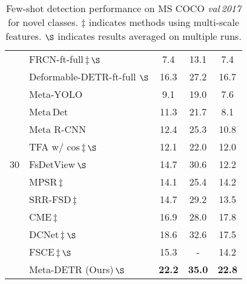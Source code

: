 \documentclass[letterpaper]{article} \usepackage{aaai22}  \usepackage{times}  \usepackage{helvet}  \usepackage{courier}  \usepackage[hyphens]{url}  \usepackage{graphicx} \urlstyle{rm} \def\UrlFont{\rm}  \usepackage{natbib}  \usepackage{caption} \DeclareCaptionStyle{ruled}{labelfont=normalfont,labelsep=colon,strut=off} \frenchspacing  \setlength{\pdfpagewidth}{8.5in}  \setlength{\pdfpageheight}{11in}  \usepackage{algorithm}
\begin{document}
\begin{table}[t!]
\begin{center}
{\begin{tabular}[t]{ c | l | ccc }
\midrule[0.66pt]

\multirow{13}{*}{30} & FRCN-ft-full\;\cite{FasterRCNN}\,$\ddag$\,$\S$ & 7.4 & 13.1 & 7.4 \\

& Deformable-DETR-ft-full\,\cite{DeformableDETR}\,$\S$ & 16.3 & 27.2 & 16.7 \\

& Meta-YOLO\;\cite{FewshotReweighting} & 9.1 & 19.0 & 7.6\\

& Meta\,Det\;\cite{metadet} & 11.3 & 21.7 & 8.1\\

& Meta R-CNN\;\cite{metarcnn} & 12.4 & 25.3 & 10.8 \\

& TFA w/ cos\;\cite{fsdet}\,$\ddag$\,$\S$ & 12.1 & 22.0 & 12.0 \\

& FsDetView\;\cite{FSDetView}\,$\S$ & 14.7 & 30.6 & 12.2 \\

& MPSR\;\cite{MPSR}\,$\ddag$\ & 14.1 & 25.4 & 14.2 \\

& SRR-FSD\;\cite{SRR-FSD}\,$\ddag$ & 14.7 & 29.2 & 13.5 \\

& CME\;\cite{CME}\,$\ddag$ & 16.9 & 28.0 & 17.8 \\

& DCNet\;\cite{DenseRelationDistillation}\,$\ddag$\,$\S$ & 18.6 & 32.6 & 17.5 \\

& FSCE\;\cite{fsce}\,$\ddag$\,$\S$ & 15.3 & - & 14.2 \\

& \cellcolor{black!6}Meta-DETR (Ours)\,$\S$ & \cellcolor{black!6}\textbf{22.2} & \cellcolor{black!6}\textbf{35.0} & \cellcolor{black!6}\textbf{22.8} \\

\bottomrule[1.0pt]

\end{tabular}
}
\end{center}
\vspace*{-3.0mm}
\caption{Few-shot detection performance on MS COCO \textit{val\,2017} for novel classes.  $\ddag$ indicates methods using multi-scale features. $\S$ indicates results averaged on multiple runs.}
\label{tab:Performance_COCO_novel}
\vspace*{-2.0mm}
\end{table}
\end{document}
